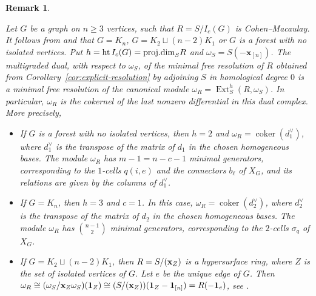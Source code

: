 \documentclass[12pt]{amsart}
\newtheorem{Remark}[Theorem]{Remark}
\def\pd{\textup{proj.dim}}
\begin{document}
\begin{Remark}\label{rem:canonical}
{\em Let $G$ be a graph on $n\geq 3$ vertices, such that $R=S/I_c(G)$ is Cohen--Macaulay. It follows from \cite[Theorem 2.8]{fm2025} and \cite[Corollary 1.5]{hqm2026} that $G=K_n$, $G=K_2\sqcup (n-2)K_1$ or $G$ is a forest with no isolated vertices. Put $h=\operatorname{ht}I_c(G)=\pd_SR$ and $\omega_S=S(-\mathbf x_{[n]})$. The multigraded dual, with
 	respect to $\omega_S$, of the minimal free resolution of $R$
 	obtained from Corollary~\ref{cor:explicit-resolution} by
 	adjoining $S$ in homological degree $0$ is a minimal free
 	resolution of the canonical module
 	$\omega_R=\operatorname{Ext}^h_S(R,\omega_S)$. In particular,
 	$\omega_R$ is the cokernel of the last nonzero differential
 	in this dual complex. More precisely,
		\begin{itemize}
 		\item[\textup{(a)}] If $G$ is a forest with no isolated vertices,
 		then $h=2$ and 
 		$\omega_R=\operatorname{coker}(d_1^\vee)$, where
 		$d_1^\vee$ is the transpose of the matrix of $d_1$ in the
 		chosen homogeneous bases. The module $\omega_R$ has
 		$m-1=n-c-1$ minimal generators, corresponding to the
 		$1$-cells $q(i,e)$ and the connectors $b_\ell$ of $X_G$, and
 		its relations are given by the columns of $d_1^\vee$.
 		
 		\item[\textup{(b)}] If $G=K_n$, then $h=3$ and $c=1$. In this
 		case, $\omega_R=\operatorname{coker}(d_2^\vee)$, where
 		$d_2^\vee$ is the transpose of the matrix of $d_2$ in the
 		chosen homogeneous bases. The module $\omega_R$ has
 		$\binom{n-1}{2}$ minimal generators, corresponding to
 		the $2$-cells $\sigma_q$ of $X_G$.

        \item[\textup{(c)}] If $G=K_2\sqcup (n-2)K_1$, then $R=S/({\bf x}_Z)$ is a hypersurface ring, where $Z$ is the set of isolated vertices of $G$. Let $e$ be the unique edge of $G$. Then $\omega_R\cong (\omega_S/{\bf x}_Z\omega_S)({\bf 1}_Z)\cong (S/({\bf x}_Z))({\bf 1}_{Z}-{\bf 1}_{[n]})=R(-{\bf 1}_{e})$, see \cite[Theorem 3.54]{HMR}. 
 	\end{itemize}
	}
\end{Remark}
\end{document}

